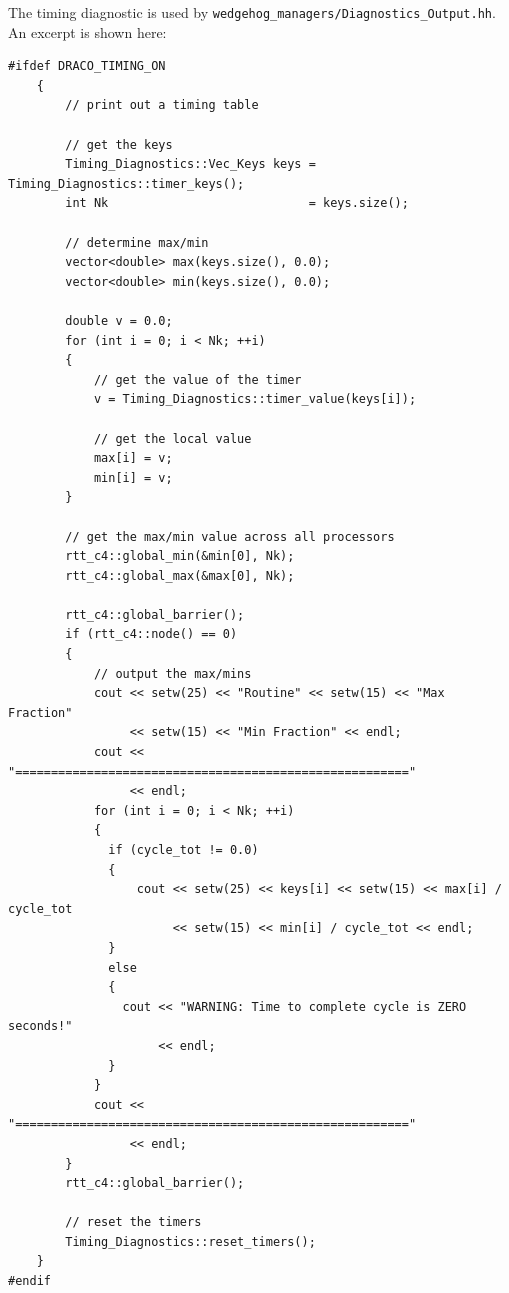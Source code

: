\documentclass[note]{ResearchNote}
\begin{document}
The timing diagnostic is used by
\texttt{wedgehog\_managers/Diagnostics\_Output.hh}.  An excerpt is
shown here: 
\begin{lstlisting}[xleftmargin=0.50in, xrightmargin=0.50in]
#ifdef DRACO_TIMING_ON
    {
        // print out a timing table

        // get the keys
        Timing_Diagnostics::Vec_Keys keys = Timing_Diagnostics::timer_keys();
        int Nk                            = keys.size();

        // determine max/min
        vector<double> max(keys.size(), 0.0);
        vector<double> min(keys.size(), 0.0);

        double v = 0.0;
        for (int i = 0; i < Nk; ++i)
        {
            // get the value of the timer
            v = Timing_Diagnostics::timer_value(keys[i]);

            // get the local value
            max[i] = v;
            min[i] = v;
        }

        // get the max/min value across all processors
        rtt_c4::global_min(&min[0], Nk);
        rtt_c4::global_max(&max[0], Nk);

        rtt_c4::global_barrier();
        if (rtt_c4::node() == 0)
        {
            // output the max/mins
            cout << setw(25) << "Routine" << setw(15) << "Max Fraction"
                 << setw(15) << "Min Fraction" << endl;
            cout << "======================================================="
                 << endl;
            for (int i = 0; i < Nk; ++i)
            {
              if (cycle_tot != 0.0)
              {
                  cout << setw(25) << keys[i] << setw(15) << max[i] / cycle_tot
                       << setw(15) << min[i] / cycle_tot << endl;
              }
              else
              {
                cout << "WARNING: Time to complete cycle is ZERO seconds!"
                     << endl;
              }
            }
            cout << "======================================================="
                 << endl;
        }
        rtt_c4::global_barrier();

        // reset the timers
        Timing_Diagnostics::reset_timers();
    }
#endif
\end{lstlisting}
\end{document}
